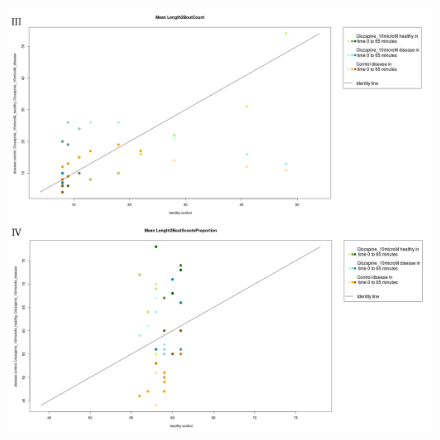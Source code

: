 \begin{figure}[h!]
\begin{center}
\includegraphics[width=15cm,height=16cm]{ApoHighCountScootsC.png}
\end{center}
\end{figure}
\newpage
